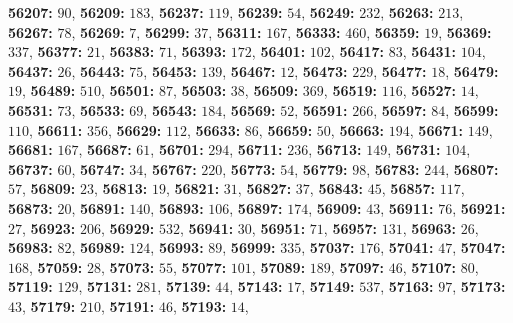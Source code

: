 \textsf{\bfseries 56207:} $90$, \textsf{\bfseries 56209:} $183$, \textsf{\bfseries 56237:} $119$, \textsf{\bfseries 56239:} $54$, \textsf{\bfseries 56249:} $232$, \textsf{\bfseries 56263:} $213$, \textsf{\bfseries 56267:} $78$, \textsf{\bfseries 56269:} $7$, \textsf{\bfseries 56299:} $37$, \textsf{\bfseries 56311:} $167$, \textsf{\bfseries 56333:} $460$, \textsf{\bfseries 56359:} $19$, \textsf{\bfseries 56369:} $337$, \textsf{\bfseries 56377:} $21$, \textsf{\bfseries 56383:} $71$, \textsf{\bfseries 56393:} $172$, \textsf{\bfseries 56401:} $102$, \textsf{\bfseries 56417:} $83$, \textsf{\bfseries 56431:} $104$, \textsf{\bfseries 56437:} $26$, \textsf{\bfseries 56443:} $75$, \textsf{\bfseries 56453:} $139$, \textsf{\bfseries 56467:} $12$, \textsf{\bfseries 56473:} $229$, \textsf{\bfseries 56477:} $18$, \textsf{\bfseries 56479:} $19$, \textsf{\bfseries 56489:} $510$, \textsf{\bfseries 56501:} $87$, \textsf{\bfseries 56503:} $38$, \textsf{\bfseries 56509:} $369$, \textsf{\bfseries 56519:} $116$, \textsf{\bfseries 56527:} $14$, \textsf{\bfseries 56531:} $73$, \textsf{\bfseries 56533:} $69$, \textsf{\bfseries 56543:} $184$, \textsf{\bfseries 56569:} $52$, \textsf{\bfseries 56591:} $266$, \textsf{\bfseries 56597:} $84$, \textsf{\bfseries 56599:} $110$, \textsf{\bfseries 56611:} $356$, \textsf{\bfseries 56629:} $112$, \textsf{\bfseries 56633:} $86$, \textsf{\bfseries 56659:} $50$, \textsf{\bfseries 56663:} $194$, \textsf{\bfseries 56671:} $149$, \textsf{\bfseries 56681:} $167$, \textsf{\bfseries 56687:} $61$, \textsf{\bfseries 56701:} $294$, \textsf{\bfseries 56711:} $236$, \textsf{\bfseries 56713:} $149$, \textsf{\bfseries 56731:} $104$, \textsf{\bfseries 56737:} $60$, \textsf{\bfseries 56747:} $34$, \textsf{\bfseries 56767:} $220$, \textsf{\bfseries 56773:} $54$, \textsf{\bfseries 56779:} $98$, \textsf{\bfseries 56783:} $244$, \textsf{\bfseries 56807:} $57$, \textsf{\bfseries 56809:} $23$, \textsf{\bfseries 56813:} $19$, \textsf{\bfseries 56821:} $31$, \textsf{\bfseries 56827:} $37$, \textsf{\bfseries 56843:} $45$, \textsf{\bfseries 56857:} $117$, \textsf{\bfseries 56873:} $20$, \textsf{\bfseries 56891:} $140$, \textsf{\bfseries 56893:} $106$, \textsf{\bfseries 56897:} $174$, \textsf{\bfseries 56909:} $43$, \textsf{\bfseries 56911:} $76$, \textsf{\bfseries 56921:} $27$, \textsf{\bfseries 56923:} $206$, \textsf{\bfseries 56929:} $532$, \textsf{\bfseries 56941:} $30$, \textsf{\bfseries 56951:} $71$, \textsf{\bfseries 56957:} $131$, \textsf{\bfseries 56963:} $26$, \textsf{\bfseries 56983:} $82$, \textsf{\bfseries 56989:} $124$, \textsf{\bfseries 56993:} $89$, \textsf{\bfseries 56999:} $335$, \textsf{\bfseries 57037:} $176$, \textsf{\bfseries 57041:} $47$, \textsf{\bfseries 57047:} $168$, \textsf{\bfseries 57059:} $28$, \textsf{\bfseries 57073:} $55$, \textsf{\bfseries 57077:} $101$, \textsf{\bfseries 57089:} $189$, \textsf{\bfseries 57097:} $46$, \textsf{\bfseries 57107:} $80$, \textsf{\bfseries 57119:} $129$, \textsf{\bfseries 57131:} $281$, \textsf{\bfseries 57139:} $44$, \textsf{\bfseries 57143:} $17$, \textsf{\bfseries 57149:} $537$, \textsf{\bfseries 57163:} $97$, \textsf{\bfseries 57173:} $43$, \textsf{\bfseries 57179:} $210$, \textsf{\bfseries 57191:} $46$, \textsf{\bfseries 57193:} $14$, 
